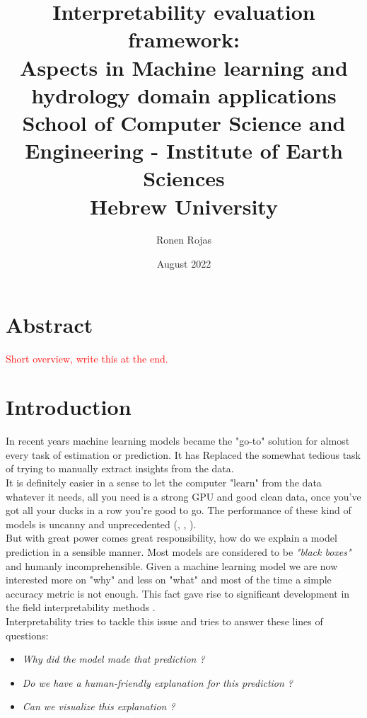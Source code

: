\documentclass[12pt]{report}
\title{
	{Interpretability evaluation framework: \\ Aspects in Machine learning and hydrology domain applications}\\
	{\large School of Computer Science and Engineering - 
		Institute of Earth Sciences}\\
	{\large Hebrew University}
}
\author{Ronen Rojas}
\date{August 2022}
\begin{document}
\maketitle
\tableofcontents
\newpage

\chapter{Abstract} 

\textcolor{red}{Short overview, write this at the end.}



\newpage
\chapter{Introduction} 

In recent years machine learning models became the "go-to" solution for almost every task of estimation or prediction. It has Replaced the somewhat tedious task of trying to manually extract insights from the data.\\

It is definitely easier in a sense to let the computer "learn" from the data whatever it needs, all you need is a strong GPU and good clean data, once you've got all your ducks in a row you're good to go. The performance of these kind of models is uncanny and unprecedented (\cite{he2015deep}, \cite{DBLP:journals/corr/abs-1805-01890}, \cite{DBLP:journals/corr/abs-1905-01392}).\\

But with great power comes great responsibility, how do we explain a model prediction in a sensible manner. Most models are considered to be \textit{"black boxes"} and humanly incomprehensible. Given a machine learning model we are now interested more on "why" and less on "what" and most of the time a simple accuracy metric is not enough. This fact gave rise to significant development in the field interpretability methods 
\cite{molnar2019}. \\

Interpretability tries to tackle this issue and tries to answer these lines of questions:
\begin{itemize}
	\item \textit{Why did the model made that prediction ?}	
	\item \textit{Do we have a human-friendly explanation for this prediction ?}	
	\item \textit{Can we visualize this explanation ? }	
\end{itemize}
\end{document}
